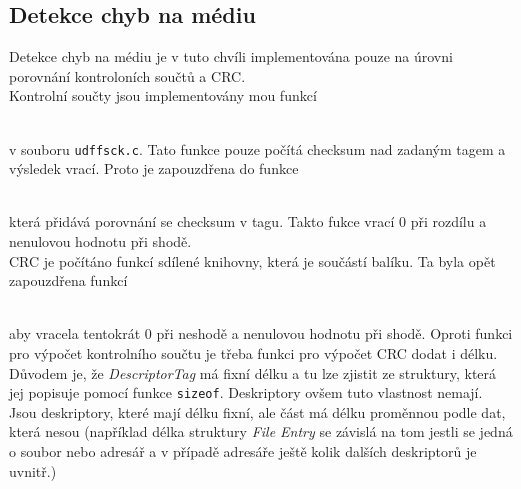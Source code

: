 \subsection{Detekce chyb na médiu}
Detekce chyb na médiu je v tuto chvíli implementována pouze na úrovni porovnání kontroloních součtů a CRC.\\
Kontrolní součty jsou implementovány mou funkcí\\
\centerline{\texttt{}}\\
v souboru \texttt{udffsck.c}. Tato funkce pouze počítá checksum nad zadaným tagem a výsledek vrací. Proto je zapouzdřena do funkce\\
\centerline{\texttt{}}\\
která přidává porovnání se checksum v tagu. Takto fukce vrací 0 při rozdílu a nenulovou hodnotu při shodě.\\
CRC je počítáno funkcí sdílené knihovny, která je součástí balíku. Ta byla opět zapouzdřena funkcí\\
\centerline{\texttt{}}\\
aby vracela tentokrát 0 při neshodě a nenulovou hodnotu při shodě. Oproti funkci pro výpočet kontrolního součtu je třeba funkci pro výpočet CRC dodat i délku. Důvodem je, že \textit{DescriptorTag} má fixní délku a tu lze zjistit ze struktury, která jej popisuje pomocí funkce \texttt{sizeof}. Deskriptory ovšem tuto vlastnost nemají. Jsou deskriptory, které mají délku fixní, ale část má délku proměnnou podle dat, která nesou (například délka struktury \textit{File Entry} se závislá na tom jestli se jedná o soubor nebo adresář a v případě adresáře ještě kolik dalších deskriptorů je uvnitř.)

